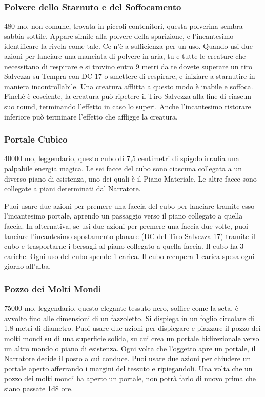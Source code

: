 \begin{multicols}{2}
	\subsubsection*{Polvere dello Starnuto e del Soffocamento}
	480 mo, non comune, trovata in piccoli contenitori, questa polverina sembra sabbia sottile. Appare simile alla polvere della sparizione, e l'incantesimo identificare la rivela come tale. Ce n'è a sufficienza per un uso. Quando usi due azioni per lanciare una manciata di polvere in aria, tu e tutte le creature che necessitano di respirare e si trovino entro 9 metri da te dovete superare un tiro Salvezza su Tempra con DC 17 o smettere di respirare, e iniziare a starnutire in maniera incontrollabile. Una creatura afflitta a questo modo è inabile e soffoca. Finché è cosciente, la creatura può ripetere il Tiro Salvezza alla fine di ciascun suo round, terminando l'effetto in caso lo superi. Anche l'incantesimo ristorare inferiore può terminare l'effetto che affligge la creatura.

	\subsubsection*{Portale Cubico}
	40000 mo, leggendario, questo cubo di 7,5 centimetri di spigolo irradia una palpabile energia magica. Le sei facce del cubo sono ciascuna collegata a un diverso piano di esistenza, uno dei quali è il Piano Materiale. Le altre facce sono collegate a piani determinati dal Narratore.

	Puoi usare due azioni per premere una faccia del cubo per lanciare tramite esso l'incantesimo portale, aprendo un passaggio verso il piano collegato a quella faccia. In alternativa, se usi due azioni per premere una faccia due volte, puoi lanciare l'incantesimo spostamento planare (DC del Tiro Salvezza 17) tramite il cubo e trasportarne i bersagli al piano collegato a quella faccia. Il cubo ha 3 cariche. Ogni uso del cubo spende 1 carica. Il cubo recupera 1 carica spesa ogni giorno all'alba.

	\subsubsection*{Pozzo dei Molti Mondi}
	75000 mo, leggendario, questo elegante tessuto nero, soffice come la seta, è avvolto fino alle dimensioni di un fazzoletto. Si dispiega in un foglio circolare di 1,8 metri di diametro. Puoi usare due azioni per dispiegare e piazzare il pozzo dei molti mondi su di una superficie solida, su cui crea un portale bidirezionale verso un altro mondo o piano di esistenza. Ogni volta che l'oggetto apre un portale, il Narratore decide il posto a cui conduce. Puoi usare due azioni per chiudere un portale aperto afferrando i margini del tessuto e ripiegandoli. Una volta che un pozzo dei molti mondi ha aperto un portale, non potrà farlo di nuovo prima che siano passate 1d8 ore.


\end{multicols}
